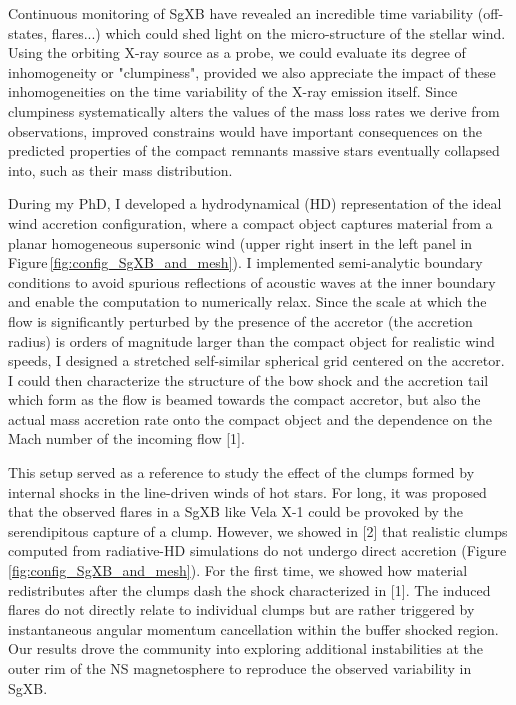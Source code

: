 \documentclass[letterpaper,12pt,onecolumn]{article}
\makeatletter
\newcommand{\sgx}{SgXB\xspace}
\newcommand*{\ns}{NS\@\xspace}
\makeatother
\begin{document}
Continuous monitoring of \sgx have revealed an incredible time variability (off-states, flares...) which could shed light on the micro-structure of the stellar wind. Using the orbiting X-ray source as a probe, we could evaluate its degree of inhomogeneity or "clumpiness", provided we also appreciate the impact of these inhomogeneities on the time variability of the X-ray emission itself. Since clumpiness systematically alters the values of the mass loss rates we derive from observations, improved constrains would have important consequences on the predicted properties of the compact remnants massive stars eventually collapsed into, such as their mass distribution.

During my PhD, I developed a hydrodynamical (HD) representation of the ideal wind accretion configuration, where a compact object captures material from a planar homogeneous supersonic wind (upper right insert in the left panel in Figure\,\ref{fig:config_SgXB_and_mesh}). I implemented semi-analytic boundary conditions to avoid spurious reflections of acoustic waves at the inner boundary and enable the computation to numerically relax. Since the scale at which the flow is significantly perturbed by the presence of the accretor (the accretion radius) is orders of magnitude larger than the compact object for realistic wind speeds, I designed a stretched self-similar spherical grid centered on the accretor. I could then characterize the structure of the bow shock and the accretion tail which form as the flow is beamed towards the compact accretor, but also the actual mass accretion rate onto the compact object and the dependence on the Mach number of the incoming flow [1]. 

This setup served as a reference to study the effect of the clumps formed by internal shocks in the line-driven winds of hot stars. For long, it was proposed that the observed flares in a \sgx like Vela X-1 could be provoked by the serendipitous capture of a clump. However, we showed in [2] that realistic clumps computed from radiative-HD simulations do not undergo direct accretion (Figure\,\,\ref{fig:config_SgXB_and_mesh}). For the first time, we showed how material redistributes after the clumps dash the shock characterized in [1]. The induced flares do not directly relate to individual clumps but are rather triggered by instantaneous angular momentum cancellation within the buffer shocked region. Our results drove the community into exploring additional instabilities at the outer rim of the \ns magnetosphere to reproduce the observed variability in \sgx.
\end{document}
